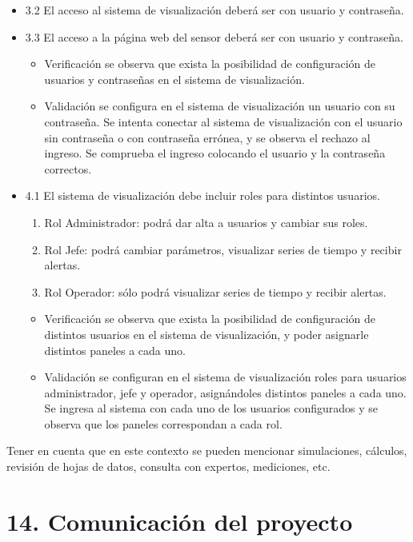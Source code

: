 \documentclass[11pt]{charter}
\begin{document}
\begin{itemize}
\item 3.2 El acceso al sistema de visualización deberá ser con usuario y contraseña.
\item 3.3 El acceso a la página web del sensor deberá ser con usuario y contraseña.
\begin{itemize}
\item Verificación se observa que exista la posibilidad de configuración de usuarios y contraseñas en el sistema de visualización.
\item Validación se configura en el sistema de visualización un usuario con su contraseña. Se intenta conectar al sistema de visualización con el usuario sin contraseña o con contraseña errónea, y se observa el rechazo al ingreso. Se comprueba el ingreso colocando el usuario y la contraseña correctos.
\end{itemize}

\item 4.1 El sistema de visualización debe incluir roles para distintos usuarios.
		 \begin{enumerate}
		 \item Rol Administrador: podrá dar alta a usuarios y cambiar sus roles.
	     \item Rol Jefe: podrá cambiar parámetros, visualizar series de tiempo y recibir alertas.
	     \item Rol Operador: sólo podrá visualizar series de tiempo y recibir alertas.
	     \end{enumerate}
	     \begin{itemize}
\item Verificación se observa que exista la posibilidad de configuración de distintos usuarios en el sistema de visualización, y poder asignarle distintos paneles a cada uno. 
\item Validación se configuran en el sistema de visualización roles para usuarios administrador, jefe y operador, asignándoles distintos paneles a cada uno. Se ingresa al sistema con cada uno de los usuarios configurados y se observa que los paneles correspondan a cada rol.
\end{itemize}
	     

\end{itemize}
Tener en cuenta que en este contexto se pueden mencionar simulaciones, cálculos, revisión de hojas de datos, consulta con expertos, mediciones, etc.



\section{14. Comunicación del proyecto}
\label{sec:comunicaciones}
\end{document}
